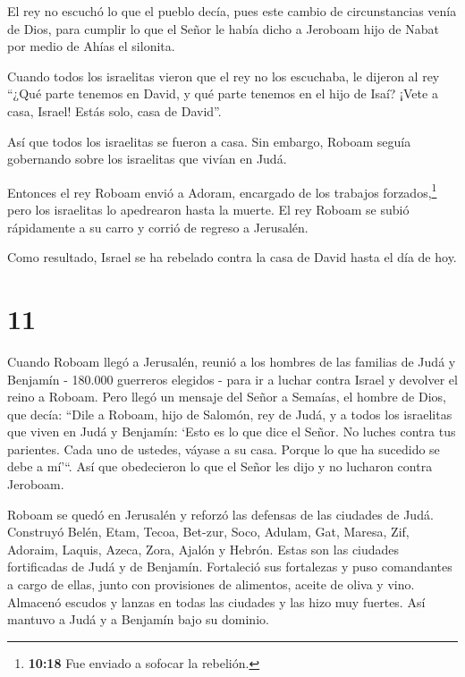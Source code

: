  El rey no escuchó lo que el pueblo decía, pues este cambio
de circunstancias venía de Dios, para cumplir lo que el Señor le había
dicho a Jeroboam hijo de Nabat por medio de Ahías el silonita.

 Cuando todos los israelitas vieron que el rey no los
escuchaba, le dijeron al rey ``¿Qué parte tenemos en David, y qué parte
tenemos en el hijo de Isaí? ¡Vete a casa, Israel! Estás solo, casa de
David''.

Así que todos los israelitas se fueron a casa.  Sin
embargo, Roboam seguía gobernando sobre los israelitas que vivían en
Judá.

 Entonces el rey Roboam envió a Adoram, encargado de los
trabajos forzados,\footnote{\textbf{10:18} Fue enviado a sofocar la
  rebelión.} pero los israelitas lo apedrearon hasta la muerte. El rey
Roboam se subió rápidamente a su carro y corrió de regreso a Jerusalén.

 Como resultado, Israel se ha rebelado contra la casa de
David hasta el día de hoy.

\hypertarget{section-10}{%
\section{11}\label{section-10}}

 Cuando Roboam llegó a Jerusalén, reunió a los hombres de
las familias de Judá y Benjamín - 180.000 guerreros elegidos - para ir a
luchar contra Israel y devolver el reino a Roboam.  Pero
llegó un mensaje del Señor a Semaías, el hombre de Dios, que decía:
 ``Dile a Roboam, hijo de Salomón, rey de Judá, y a todos
los israelitas que viven en Judá y Benjamín:  `Esto es lo
que dice el Señor. No luches contra tus parientes. Cada uno de ustedes,
váyase a su casa. Porque lo que ha sucedido se debe a mí'``. Así que
obedecieron lo que el Señor les dijo y no lucharon contra Jeroboam.

 Roboam se quedó en Jerusalén y reforzó las defensas de las
ciudades de Judá.  Construyó Belén, Etam, Tecoa,
 Bet-zur, Soco, Adulam,  Gat, Maresa, Zif,
 Adoraim, Laquis, Azeca,  Zora, Ajalón y
Hebrón. Estas son las ciudades fortificadas de Judá y de Benjamín.
 Fortaleció sus fortalezas y puso comandantes a cargo de
ellas, junto con provisiones de alimentos, aceite de oliva y vino.
 Almacenó escudos y lanzas en todas las ciudades y las hizo
muy fuertes. Así mantuvo a Judá y a Benjamín bajo su dominio.

